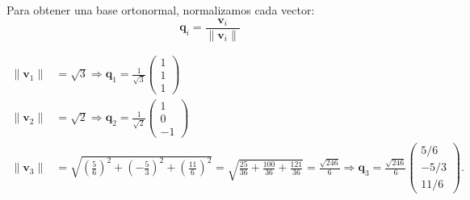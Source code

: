 \begin{myproof}
Para obtener una base ortonormal, normalizamos cada vector:
\[
\mathbf{q}_i = \frac{\mathbf{v}_i}{\|\mathbf{v}_i\|}
\]

\begin{align*}
\|\mathbf{v}_1\| &= \sqrt{3} \Rightarrow \mathbf{q}_1 = \frac{1}{\sqrt{3}} \begin{pmatrix} 1 \\ 1 \\ 1 \end{pmatrix} \\
\|\mathbf{v}_2\| &= \sqrt{2} \Rightarrow \mathbf{q}_2 = \frac{1}{\sqrt{2}} \begin{pmatrix} 1 \\ 0 \\ -1 \end{pmatrix} \\
\|\mathbf{v}_3\| &= \sqrt{\left(\frac{5}{6}\right)^2 + \left(-\frac{5}{3}\right)^2 + \left(\frac{11}{6}\right)^2} = \sqrt{\frac{25}{36} + \frac{100}{36} + \frac{121}{36}} = \frac{\sqrt{246}}{6}\Rightarrow \mathbf{q}_3= \frac{\sqrt{246}}{6} \begin{pmatrix} 5/6 \\ -5/3 \\ 11/6 \end{pmatrix}.
\end{align*}
\end{myproof}


